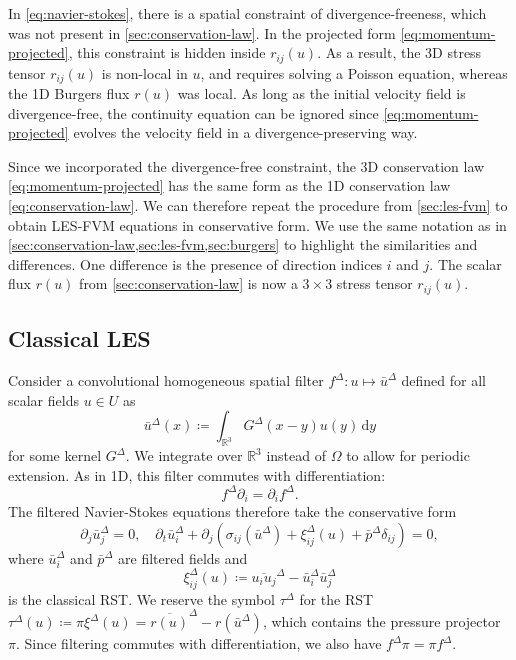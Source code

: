 \documentclass[preprint,twocolumn,5p]{elsarticle}
\begin{document}
In \cref{eq:navier-stokes},
there is a spatial constraint of divergence-freeness, which was not present
in \cref{sec:conservation-law}. In the projected form
\eqref{eq:momentum-projected}, this constraint is hidden inside $r_{i j}(u)$.
As a result, the 3D stress tensor $r_{i j}(u)$ is non-local in $u$,
and requires solving a Poisson equation,
whereas the 1D Burgers flux $r(u)$ was local.
As long as the initial velocity field is divergence-free,
the continuity equation can be ignored since
\cref{eq:momentum-projected} evolves the velocity field in a
divergence-preserving way.

Since we incorporated the divergence-free constraint,
the 3D conservation law \eqref{eq:momentum-projected}
has the same form as
the 1D conservation law \eqref{eq:conservation-law}.
We can therefore repeat the procedure from \cref{sec:les-fvm}
to obtain LES-FVM equations in conservative form.
We use the same notation as in
\cref{sec:conservation-law,sec:les-fvm,sec:burgers}
to highlight the similarities and differences.
One difference is the presence of direction indices $i$ and $j$.
The scalar flux $r(u)$ from \cref{sec:conservation-law}
is now a $3 \times 3$ stress tensor $r_{i j}(u)$.

\subsection{Classical LES}

Consider a convolutional homogeneous spatial filter
$f^\Delta : u \mapsto \bar{u}^\Delta$ defined
for all scalar fields $u \in U$ as
\begin{equation}
    \bar{u}^\Delta(x) \coloneq \int_{\mathbb{R}^3} G^\Delta(x - y) u(y) \, \mathrm{d} y
\end{equation}
for some kernel $G^\Delta$.
We integrate over $\mathbb{R}^3$ instead of $\Omega$
to allow for periodic extension.
As in 1D, this filter commutes with differentiation:
\begin{equation}
    f^\Delta \partial_i = \partial_i f^\Delta.
\end{equation}
The filtered Navier-Stokes equations therefore take the conservative form
\begin{equation} \label{eq:navier-stokes-filtered}
    \partial_j \bar{u}^\Delta_j = 0, \quad
    \partial_t \bar{u}^\Delta_i
    + \partial_j \left( \sigma_{i j}(\bar{u}^\Delta) + \xi^\Delta_{i j}(u) + \bar{p}^\Delta \delta_{i j} \right)
    = 0,
\end{equation}
where $\bar{u}^\Delta_i$ and $\bar{p}^\Delta$ are filtered fields and
\begin{equation}
    \xi^\Delta_{i j}(u) \coloneq \overline{u_i u_j}^\Delta - \bar{u}^\Delta_i \bar{u}^\Delta_j
\end{equation}
is the classical RST.
We reserve the symbol $\tau^\Delta$ for the RST
$\tau^\Delta(u) \coloneq \pi \xi^\Delta(u) = \overline{r(u)}^\Delta - r(\bar{u}^\Delta)$,
which contains the pressure projector $\pi$.
Since filtering commutes with differentiation,
we also have $f^\Delta \pi = \pi f^\Delta$.
\end{document}

